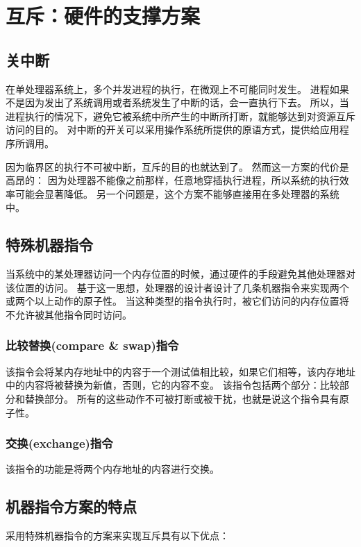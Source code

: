 
\section{互斥：硬件的支撑方案}
{
    \subsection{关中断}
    {
        在单处理器系统上，多个并发进程的执行，在微观上不可能同时发生。
        进程如果不是因为发出了系统调用或者系统发生了中断的话，会一直执行下去。
        所以，当进程执行的情况下，避免它被系统中所产生的中断所打断，就能够达到对资源互斥访问的目的。
        对中断的开关可以采用操作系统所提供的原语方式，提供给应用程序所调用。

        因为临界区的执行不可被中断，互斥的目的也就达到了。
        然而这一方案的代价是高昂的：
        因为处理器不能像之前那样，任意地穿插执行进程，所以系统的执行效率可能会显著降低。
        另一个问题是，这个方案不能够直接用在多处理器的系统中。
    }

    \subsection{特殊机器指令}
    {
        当系统中的某处理器访问一个内存位置的时候，通过硬件的手段避免其他处理器对该位置的访问。
        基于这一思想，处理器的设计者设计了几条机器指令来实现两个或两个以上动作的原子性。
        当这种类型的指令执行时，被它们访问的内存位置将不允许被其他指令同时访问。

        \subsubsection{比较替换(compare \& swap)指令}
        {
            该指令会将某内存地址中的内容于一个测试值相比较，如果它们相等，该内存地址中的内容将被替换为新值，否则，它的内容不变。
            该指令包括两个部分：比较部分和替换部分。
            所有的这些动作不可被打断或被干扰，也就是说这个指令具有原子性。
        }

        \subsubsection{交换(exchange)指令}
        {
            该指令的功能是将两个内存地址的内容进行交换。
        }

        \subsection{机器指令方案的特点}
        {
            采用特殊机器指令的方案来实现互斥具有以下优点：

}}}
